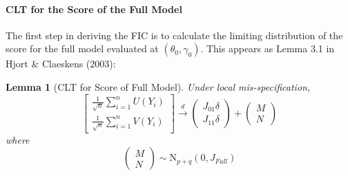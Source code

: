 \documentclass[12pt]{article}
\newtheorem{lem}{Lemma}
\theoremstyle{definition}
\begin{document}
\paragraph{CLT for the Score of the Full Model} The first step in deriving the FIC is to calculate the limiting distribution of the score for the full model evaluated at $(\theta_0, \gamma_0)$. This appears as Lemma 3.1 in Hjort \& Claeskens (2003):
\begin{lem}[CLT for Score of Full Model]
Under local mis-specification,
	$$\left[\begin{array}{c}
		\frac{1}{\sqrt{n}}\sum_{i=1}^n U(Y_i)\\
		\frac{1}{\sqrt{n}}\sum_{i=1}^n V(Y_i)
	\end{array}\right] \overset{d}{\rightarrow}
	\left(\begin{array}{c}
		J_{01}\delta\\
		J_{11}\delta
	\end{array}\right) + 	
	\left(\begin{array}{c}
		M\\
		N
	\end{array}\right)$$
where
	$$\left(\begin{array}{c}
		M\\
		N
	\end{array}\right) \sim \mbox{N}_{p+q}(0, J_{Full})$$
\end{lem}
\end{document}
